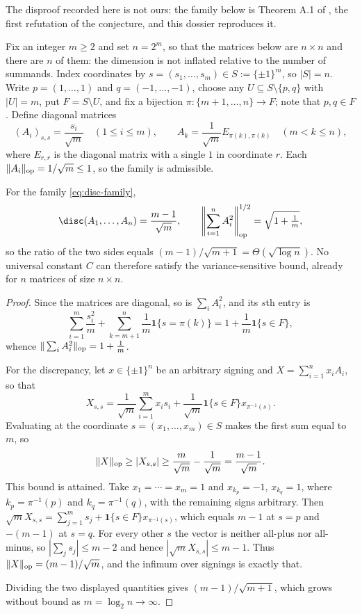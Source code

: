The disproof recorded here is not ours: the family below is Theorem A.1 of \citet{AkbasSra2026}, the first refutation of the conjecture, and this dossier reproduces it.

Fix an integer $m\ge2$ and set $n=2^m$, so that the matrices below are $n\times n$ and there are $n$ of them: the dimension is not inflated relative to the number of summands.  Index coordinates by $s=(s_1,\ldots,s_m)\in S:=\{\pm1\}^m$, so $|S|=n$.  Write $p=(1,\ldots,1)$ and $q=(-1,\ldots,-1)$, choose any $U\subseteq S\setminus\{p,q\}$ with $|U|=m$, put $F=S\setminus U$, and fix a bijection $\pi:\{m+1,\ldots,n\}\to F$; note that $p,q\in F$.  Define diagonal matrices
\begin{equation}\label{eq:disc-family}
(A_i)_{s,s}=\frac{s_i}{\sqrt m}\quad(1\le i\le m),
\qquad
A_k=\frac1{\sqrt m}E_{\pi(k),\pi(k)}\quad(m<k\le n),
\end{equation}
where $E_{r,r}$ is the diagonal matrix with a single $1$ in coordinate $r$.  Each $\|A_i\|_{\rm op}=1/\sqrt m\le1$, so the family is admissible.

\begin{theorem}\label{thm:discrepancy}
For the family \eqref{eq:disc-family},
\[
\disc(A_1,\ldots,A_n)=\frac{m-1}{\sqrt m},
\qquad
\left\|\sum_{i=1}^nA_i^2\right\|_{\rm op}^{1/2}=\sqrt{1+\tfrac1m},
\]
so the ratio of the two sides equals $(m-1)/\sqrt{m+1}=\Theta(\sqrt{\log n})$.  No universal constant $C$ can therefore satisfy the variance-sensitive bound, already for $n$ matrices of size $n\times n$.
\end{theorem}
\begin{proof}
Since the matrices are diagonal, so is $\sum_iA_i^2$, and its $s$th entry is
\[
\sum_{i=1}^m\frac{s_i^2}m+\sum_{k=m+1}^n\frac1m\mathbf 1\{s=\pi(k)\}=1+\frac1m\mathbf 1\{s\in F\},
\]
whence $\|\sum_iA_i^2\|_{\rm op}=1+\frac1m$.

For the discrepancy, let $x\in\{\pm1\}^n$ be an arbitrary signing and $X=\sum_{i=1}^nx_iA_i$, so that
\[
X_{s,s}=\frac1{\sqrt m}\sum_{i=1}^mx_is_i+\frac1{\sqrt m}\mathbf 1\{s\in F\}x_{\pi^{-1}(s)}.
\]
Evaluating at the coordinate $s=(x_1,\ldots,x_m)\in S$ makes the first sum equal to $m$, so
\[
\|X\|_{\rm op}\ge|X_{s,s}|\ge\frac{m}{\sqrt m}-\frac1{\sqrt m}=\frac{m-1}{\sqrt m}.
\]
This bound is attained.  Take $x_1=\cdots=x_m=1$ and $x_{k_p}=-1$, $x_{k_q}=1$, where $k_p=\pi^{-1}(p)$ and $k_q=\pi^{-1}(q)$, with the remaining signs arbitrary.  Then $\sqrt mX_{s,s}=\sum_{j=1}^ms_j+\mathbf 1\{s\in F\}x_{\pi^{-1}(s)}$, which equals $m-1$ at $s=p$ and $-(m-1)$ at $s=q$.  For every other $s$ the vector is neither all-plus nor all-minus, so $|\sum_js_j|\le m-2$ and hence $|\sqrt mX_{s,s}|\le m-1$.  Thus $\|X\|_{\rm op}=(m-1)/\sqrt m$, and the infimum over signings is exactly that.

Dividing the two displayed quantities gives $(m-1)/\sqrt{m+1}$, which grows without bound as $m=\log_2n\to\infty$.
\end{proof}

